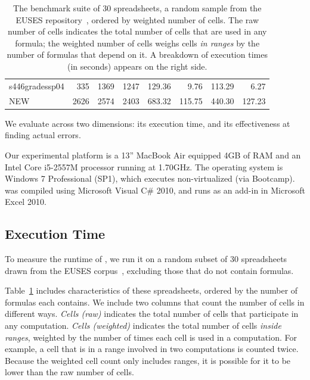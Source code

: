 \begin{table}[!b]
\begin{tabular}{l|rrr||r|rrr}
\small{s446gradessp04} & \small{335} & \small{1369} & \small{1247} & \small{129.36} & \small{9.76} & \small{113.29} & \small{6.27} \\ 
\small{NEW} & \small{2626} & \small{2574} & \small{2403} & \small{683.32} & \small{115.75} & \small{440.30} & \small{127.23} \\ 
    \end{tabular}%
  \caption{The benchmark suite of 30 spreadsheets, a random sample from the EUSES repository~\cite{Fisher:2005:ESC:1082983.1083242}, ordered by weighted number of cells. The raw number of cells indicates the total number of cells that are used in any formula; the weighted number of cells weighs cells \emph{in ranges} by the number of formulas that depend on it. A breakdown of \checkcell{} execution times (in seconds) appears on the right side.\label{tab:spreadsheet_characteristics}}
\end{table}

We evaluate \checkcell{} across two dimensions: its execution time,
and its effectiveness at finding actual errors.

Our experimental platform is a 13'' MacBook Air equipped 4GB of RAM
and an Intel Core i5-2557M processor running at 1.70GHz. The operating
system is Windows 7 Professional (SP1), which executes non-virtualized
(via Bootcamp). \checkcell{} was compiled using Microsoft Visual C\#
2010, and runs as an add-in in Microsoft Excel 2010.

\subsection{Execution Time}
\label{sec:execution_time}

To measure the runtime of \checkcell{}, we run it on a random subset
of 30 spreadsheets drawn from the EUSES
corpus~\cite{Fisher:2005:ESC:1082983.1083242}, excluding those that do not contain
formulas.

Table~\ref{tab:spreadsheet_characteristics} includes characteristics
of these spreadsheets, ordered by the number of formulas each
contains. We include two columns that count the number of cells in
different ways. \emph{Cells (raw)} indicates the total number of cells
that participate in any computation. \emph{Cells (weighted)} indicates
the total number of cells \emph{inside ranges}, weighted by the number
of times each cell is used in a computation. For example, a cell that
is in a range involved in two computations is counted twice. Because
the weighted cell count only includes ranges, it is possible for it to
be lower than the raw number of cells.

